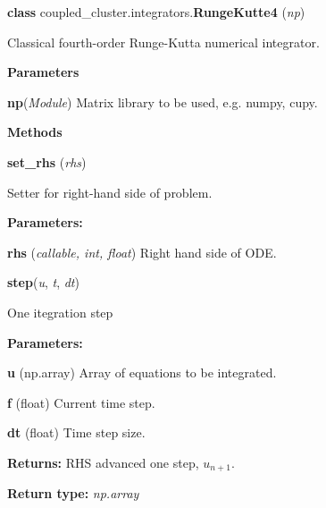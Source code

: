 \begin{tcolorbox}
    {\selectfont
    \textbf{class} coupled\_cluster.integrators.\textbf{RungeKutte4}
    (\emph{np})

    \vspace{1em}
    Classical fourth-order Runge-Kutta numerical integrator.

    \vspace{1em}
    \textbf{Parameters}

    \hspace{2em}\textbf{np}(\emph{Module})
        Matrix library to be used, e.g. numpy, cupy.

    \vspace{1em} 
    \textbf{Methods}

    \hspace{2em} \textbf{set\_rhs} (\emph{rhs})

        \begin{adjustwidth}{4em}{}
        Setter for right-hand side of problem.

        \textbf{Parameters:} 

            \hspace{1.5em}\textbf{rhs} (\emph{callable, int, float}) 
                Right hand side of ODE.

        \end{adjustwidth}

        \hspace{2em} \textbf{step}(\emph{u}, \emph{t}, \emph{dt})

        \begin{adjustwidth}{4em}{}
        One itegration step

        \textbf{Parameters:} 
        
            \hspace{1.5em} \textbf{u} (np.array) Array of equations to be integrated.

            \hspace{1.5em} \textbf{f} (float) Current time step.

            \hspace{1.5em} \textbf{dt} (float) Time step size.

        \textbf{Returns:} RHS advanced one step, $u_{n+1}$.
        
        \textbf{Return type:} \emph{np.array}

        \end{adjustwidth}




    } 
\end{tcolorbox}